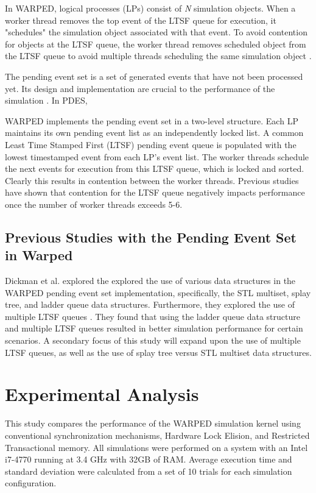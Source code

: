 \documentclass[a4paper]{article}
\begin{document}
\indent
In WARPED, logical processes (LPs) consist of \textit{N} simulation objects.
When a worker thread removes the top event of the LTSF queue for execution, it
"schedules" the simulation object associated with that event.  To avoid
contention for objects at the LTSF queue, the worker thread removes scheduled
object from the LTSF queue to avoid multiple threads scheduling the same
simulation object \cite{muthalagu}.
\par

\indent 
The pending event set is a set of generated events that have not been
processed yet.  Its design and implementation are crucial to the performance of
the simulation \cite{twpes}.  In PDES,  

\indent
WARPED implements the pending event set in a two-level structure. Each LP
maintains its own pending event list as an independently locked list.  A common
Least Time Stamped First (LTSF) pending event queue is populated with the lowest
timestamped event from each LP's event list.  The worker threads schedule the
next events for execution from this LTSF queue, which is locked and sorted.
Clearly this results in contention between the worker threads.  Previous studies
have shown that contention for the LTSF queue negatively impacts performance
once the number of worker threads exceeds 5-6.


\subsection{\textbf{Previous Studies with the Pending Event Set in Warped}}

\indent Dickman et al. explored the explored the use of various data structures
in the WARPED pending event set implementation, specifically, the STL multiset,
splay tree, and ladder queue data structures. Furthermore, they explored the use
of multiple LTSF queues \cite{dickman}.  They found that using the ladder queue
data structure and multiple LTSF queues resulted in better simulation
performance for certain scenarios.  A secondary focus of this study will expand
upon the use of multiple LTSF queues, as well as the use of splay tree versus 
STL multiset data structures.\par

\newpage
\section{\textbf{Experimental Analysis}}

\indent This study compares the performance of the WARPED simulation kernel
using conventional synchronization mechanisms, Hardware Lock Elision, and
Restricted Transactional memory.  All simulations were performed on a system
with an Intel i7-4770 running at 3.4 GHz with 32GB of RAM.  Average execution
time and standard deviation were calculated from a set of 10 trials for each
simulation configuration.\par
\end{document}
